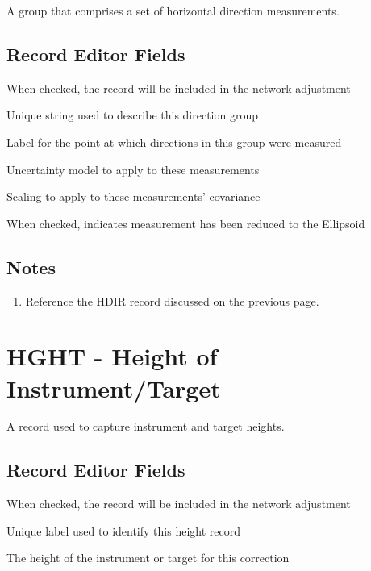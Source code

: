 A group that comprises a set of horizontal direction measurements.

\subsection*{Record Editor Fields}

\begin{description}[leftmargin=!,labelwidth=\widthof{\bfseries Uncertainty:}]
\item[Enabled:] When checked, the record will be included in the network adjustment
\item[Label:] Unique string used to describe this direction group
\item[At Point:] Label for the point at which directions in this group were measured
\item[Uncertainty:] Uncertainty model to apply to these measurements
\item[Scaling:] Scaling to apply to these measurements' covariance
\item[Reduced:] When checked, indicates measurement has been reduced to the Ellipsoid
\end{description}

\subsection*{Notes}
\begin{enumerate}
\item Reference the HDIR record discussed on the previous page.
\end{enumerate}


\newpage
\section{HGHT - Height of Instrument/Target}

A record used to capture instrument and target heights.

\subsection*{Record Editor Fields}

\begin{description}[leftmargin=!,labelwidth=\widthof{\bfseries Enabled:}]
\item[Enabled:] When checked, the record will be included in the network adjustment
\item[Label:] Unique label used to identify this height record
\item[Height:] The height of the instrument or target for this correction
\end{description}

